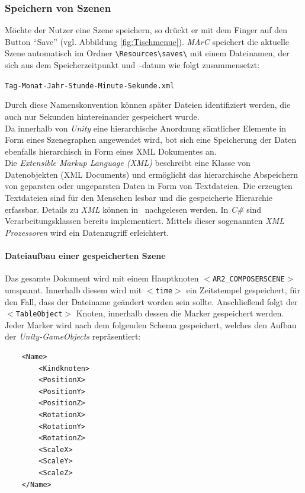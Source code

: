 \subsubsection{Speichern von Szenen}\label{Speichern}
Möchte der Nutzer eine Szene speichern, so drückt er mit dem Finger auf den Button "`Save"' (vgl. Abbildung \ref{fig:Tischmenue}). \textit{MArC} speichert die aktuelle Szene automatisch im Ordner \texttt{\textbackslash Resources\textbackslash saves\textbackslash} mit einem Dateinamen, der sich aus dem Speicherzeitpunkt und~-datum wie folgt zusammensetzt:
\begin{center}
	\texttt{Tag-Monat-Jahr-Stunde-Minute-Sekunde.xml}
\end{center}
Durch diese Namenskonvention können später Dateien identifiziert werden, die auch nur Sekunden hintereinander gespeichert wurde.\\
Da innerhalb von \textit{Unity} eine hierarchische Anordnung sämtlicher Elemente in Form eines Szenegraphen angewendet wird, bot sich eine Speicherung der Daten ebenfalls hierarchisch in Form eines XML Dokumentes an.\\
Die \textit{Extensible Markup Language (XML)} beschreibt eine Klasse von Datenobjekten (XML Documents) und ermöglicht das hierarchische Abspeichern von geparsten oder ungeparsten Daten in Form von Textdateien. Die erzeugten Textdateien sind für den Menschen lesbar und die gespeicherte Hierarchie erfassbar. Details zu \textit{XML} können in~\cite{bray1998extensible} nachgelesen werden. In \textit{C\#} sind Verarbeitungsklassen bereits implementiert. Mittels dieser sogenannten \textit{XML Prozessoren} wird ein Datenzugriff erleichtert.

\paragraph{Dateiaufbau einer gespeicherten Szene}
Das gesamte Dokument wird mit einem Hauptknoten \texttt{$<$AR2\_COMPOSERSCENE$>$} umspannt. Innerhalb diesem wird mit \texttt{$<$time$>$}
ein Zeitstempel gespeichert, für den Fall, dass der Dateiname geändert worden sein sollte.
Anschließend folgt der \texttt{$<$TableObject$>$} Knoten, innerhalb dessen die Marker gespeichert werden. Jeder Marker wird nach dem folgenden Schema gespeichert, welches den Aufbau der \emph{Unity-GameObjects} repräsentiert:

 \begin{lstlisting}
	<Name>
		<Kindknoten>
		<PositionX>
		<PositionY>
		<PositionZ>
		<RotationX>
		<RotationY>
		<RotationZ>
		<ScaleX>
		<ScaleY>
		<ScaleZ>
	</Name>
 \end{lstlisting}

